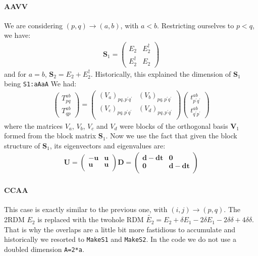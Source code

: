 \documentclass{article}
\newcommand  \equ[2]       {\begin{align}#2\label{#1}\end{align}}
\renewcommand\b[1]         {\mathbf{#1}}
\newcommand  \var[1]       {\texttt{#1}}
\begin{document}
\paragraph{AAVV}

We are considering $(p,q)\rightarrow(a,b)$, with $a<b$. Restricting ourselves to $p<q$, we have:
\equ{ }{
  \b{S}_1=\begin{pmatrix} E_2 & E_2^\dagger \\ E_2^\dagger & E_2 \end{pmatrix}
}
and for $a=b$, $\b{S}_2=E_2+E_2^\dagger$.
Historically, this explained the dimension of $\b{S}_1$ being \var{S1:aAaA} 
We had:
\equ{}{
  \begin{pmatrix}T_{pq}^{ab}\\T_{qp}^{ab}\end{pmatrix}
  =
  \begin{pmatrix}
    (V_a)_{pq,p^\prime q^\prime}  & (V_b)_{pq,p^\prime q^\prime} \\
    (V_c)_{pq,p^\prime q^\prime}  & (V_d)_{pq,p^\prime q^\prime} \\
  \end{pmatrix}
  \begin{pmatrix}t_{p^\prime q^\prime}^{ab}\\t_{q^\prime p^\prime}^{ab}\end{pmatrix}
}
where the matrices $V_a$, $V_b$, $V_c$ and $V_d$ were blocks of the orthogonal basis $\b{V}_1$ formed from the block matrix $\b{S}_1$.
Now we use the fact that given the block structure of $\b{S}_1$, its eigenvectors and eigenvalues are: 
\equ{ }{
  \b{U}=\begin{pmatrix}
         -\b{u} & \b{u} \\
          \b{u} & \b{u} \\
        \end{pmatrix}
  \b{D}=\begin{pmatrix}
    \b{d}-\b{dt} & \b{0} \\
    \b{0} & \b{d}-\b{dt} \\
        \end{pmatrix}
}

\paragraph{CCAA}

This case is exactly similar to the previous one, with $(i,j)\rightarrow(p,q)$. The 2RDM $E_2$ is replaced with the twohole RDM $\tilde{E_2}=E_2+\delta E_1-2\delta E_1 -2\delta\delta +4\delta\delta$. That is why the overlaps are a little bit more fastidious to accumulate and historically we resorted to \var{MakeS1} and \var{MakeS2}. In the code we do not use a doubled dimension \var{A=2*a}.
\end{document}
